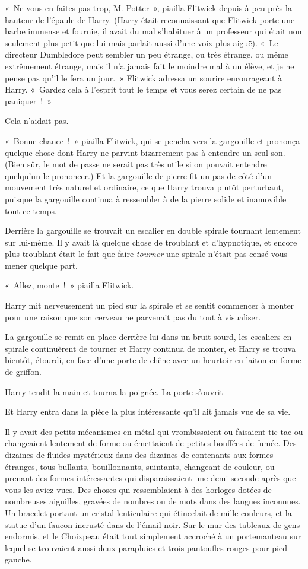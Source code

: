 «~Ne vous en faites pas trop, M. Potter~», piailla Flitwick depuis à peu près la hauteur de l'épaule de Harry.
(Harry était reconnaissant que Flitwick porte une barbe immense et fournie, il avait du mal s'habituer à un professeur qui était non seulement plus petit que lui mais parlait aussi d'une voix plus aiguë).
«~Le directeur Dumbledore peut sembler un peu étrange, ou très étrange, ou même extrêmement étrange, mais il n'a jamais fait le moindre mal à un élève, et je ne pense pas qu'il le fera un jour.~»
Flitwick adressa un sourire encourageant à Harry.
«~Gardez cela à l'esprit tout le temps et vous serez certain de ne pas paniquer~!~»

Cela n'aidait pas.

«~Bonne chance~!~»
piailla Flitwick, qui se pencha vers la gargouille et prononça quelque chose dont Harry ne parvint bizarrement pas à entendre un seul son.
(Bien sûr, le mot de passe ne serait pas très utile si on pouvait entendre quelqu'un le prononcer.)
Et la gargouille de pierre fit un pas de côté d'un mouvement très naturel et ordinaire, ce que Harry trouva plutôt perturbant, puisque la gargouille continua à ressembler à de la pierre solide et inamovible tout ce temps.

Derrière la gargouille se trouvait un escalier en double spirale tournant lentement sur lui-même.
Il y avait là quelque chose de troublant et d'hypnotique, et encore plus troublant était le fait que faire \emph{tourner} une spirale n'était pas censé vous mener quelque part.

«~Allez, monte~!~»
piailla Flitwick.

Harry mit nerveusement un pied sur la spirale et se sentit commencer à monter pour une raison que son cerveau ne parvenait pas du tout à visualiser.

La gargouille se remit en place derrière lui dans un bruit sourd, les escaliers en spirale continuèrent de tourner et Harry continua de monter, et Harry se trouva bientôt, étourdi, en face d'une porte de chêne avec un heurtoir en laiton en forme de griffon.

Harry tendit la main et tourna la poignée.
La porte s'ouvrit

Et Harry entra dans la pièce la plus intéressante qu'il ait jamais vue de sa vie.

Il y avait des petits mécanismes en métal qui vrombissaient ou faisaient tic-tac ou changeaient lentement de forme ou émettaient de petites bouffées de fumée.
Des dizaines de fluides mystérieux dans des dizaines de contenants aux formes étranges, tous bullants, bouillonnants, suintants, changeant de couleur, ou prenant des formes intéressantes qui disparaissaient une demi-seconde après que vous les aviez vues.
Des choses qui ressemblaient à des horloges dotées de nombreuses aiguilles, gravées de nombres ou de mots dans des langues inconnues.
Un bracelet portant un cristal lenticulaire qui étincelait de mille couleurs, et la statue d'un faucon incrusté dans de l'émail noir.
Sur le mur des tableaux de gens endormis, et le Choixpeau était tout simplement accroché à un portemanteau sur lequel se trouvaient aussi deux parapluies et trois pantoufles rouges pour pied gauche.

